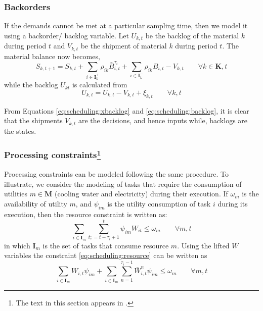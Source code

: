 \subsubsection{Backorders}
If the demands cannot be met at a particular sampling time, then we
model it using a backorder/ backlog variable.
Let $U_{k,t}$ be the backlog of the material $k$ during period
$t$ and $V_{k,t}$ be the shipment of material $k$ during period
$t$. The material balance now becomes,
\begin{equation}
\label{eq:scheduling:xbacklog}
S_{k,t+1} = S_{k,t} + \sum_{i\in
  \mathbf{I}_k^+}\rho_{ik}\bar{B}^{\tau_i}_{i,t}+ \sum_{i\in
  \mathbf{I}_k^-}\rho_{ik}B_{i,t} - V_{k,t} \qquad \forall k \in \mathbf{K},t
\end{equation}
while the backlog $U_{kt}$ is calculated from
\begin{equation}
\label{eq:scheduling:backlog}
U_{k,t} = U_{k,t} - V_{k,t} + \xi_{k,t} \qquad \forall k,t
\end{equation}

From Equations \eqref{eq:scheduling:xbacklog} and
\eqref{eq:scheduling:backlog}, it is clear that the shipments
$V_{k,t}$ are the decisions, and hence inputs while, backlogs are the states.

\subsubsection{Processing constraints\footnote{The text in this
  section appears in \citet{subramanian:maravelias:rawlings:2012}.}}
Processing constraints can be modeled following the same procedure. To
illustrate, we consider the modeling of tasks that require the
consumption of utilities $m \in \mathbf{M}$ (\eg cooling water and
electricity) during their execution. If $\omega_m$ is the availability
of utility $m$, and $\psi_{im}$ is the utility consumption of task $i$
during its execution, then the resource constraint is written as:
\begin{equation}
\label{eq:scheduling:resource}
\sum_{i \in \mathbf{I}_m} \sum_{t;=t-\tau_i+1}^{t} \psi_{im}W_{it}
\leq \omega_m \qquad \forall m,t
\end{equation}
in which $\mathbf{I}_m$ is the set of tasks that consume resource $m$.
Using the lifted $W$ variables the constraint
\eqref{eq:scheduling:resource} can be written as
\begin{equation}
\sum_{i\in\mathbf{I}_m}W_{i,t}\psi_{im} + \sum_{i \in
  \mathbf{I}_m}\sum_{n=1}^{\tau_i-1}\bar{W}_{i,t}^{n}\psi_{im} \leq
\omega_m \qquad \forall m,t
\end{equation}

